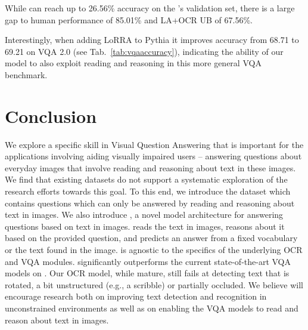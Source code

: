 \documentclass[10pt,twocolumn,letterpaper]{article}
\begin{document}
While  \approachNameShort can reach up to 26.56\% accuracy on the \datasetName's validation set, there is a large gap to human performance of 85.01\% and LA+OCR UB of 67.56\%.

Interestingly, when adding LoRRA to Pythia it improves accuracy from 68.71 to 69.21 on  VQA 2.0 \cite{goyal2017accurate} (see Tab.~\ref{tab:vqaaccuracy}), indicating the  ability of our model to also exploit reading and reasoning in this more general VQA benchmark.


 \section{Conclusion}

We explore a specific skill in Visual Question Answering that is important for the 
applications involving aiding 
visually impaired users -- answering 
questions about everyday images that involve reading and reasoning about text in these images. We find that
existing datasets do not support a systematic exploration of the research efforts towards this goal.
To this end, we introduce the 
\datasetName dataset which contains questions which can only be answered by reading and reasoning about text in images.  
We also introduce \approachName, a novel model architecture for answering questions based on text in images. \approachNameShort reads the text in images, reasons about it based on the provided question, and predicts an answer from a fixed vocabulary or the text found in the image. \approachNameShort is agnostic to the specifics of the underlying OCR and VQA modules.
\approachNameShort significantly outperforms the current state-of-the-art VQA models on \datasetName.
Our OCR model, while mature, still fails at detecting text that is rotated,
a bit unstructured (e.g., a scribble) or partially occluded. We believe 
\datasetName will encourage research both on improving text detection and recognition in unconstrained environments as well as on enabling the VQA models to read and reason about text in images. 

 
{\small


}
\newpage
\appendix
\end{document}
